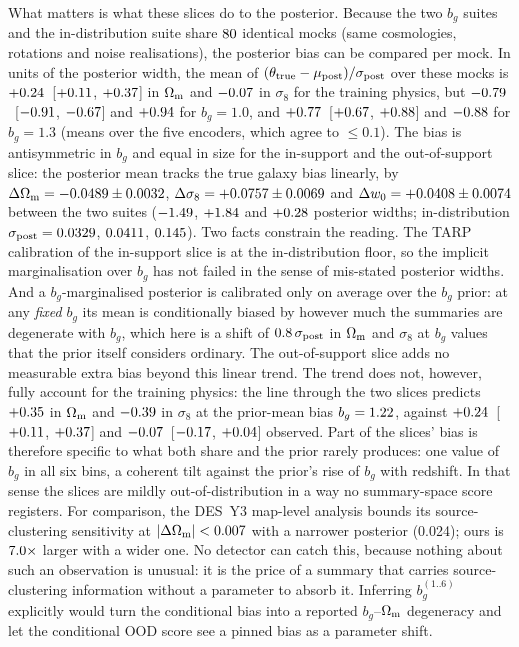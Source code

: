 \documentclass[9pt,twocolumn]{extarticle}
\newcommand{\Om}{\Omega_{\rm m}}
\newcommand{\sig}{\sigma_8}
\newcommand{\bg}{b_g}
\begin{document}
What matters is what these slices do to the posterior. Because the two $\bg$ suites and the
in-distribution suite share $80$ identical mocks (same cosmologies, rotations and noise
realisations), the posterior bias can be compared per mock. In units of the posterior width, the mean
of $(\theta_{\rm true}-\mu_{\rm post})/\sigma_{\rm post}$ over these mocks is
$+0.24$~[$+0.11$, $+0.37$] in $\Om$ and
$-0.07$ in $\sig$ for the training physics, but $-0.79$~[$-0.91$,
$-0.67$] and $+0.94$ for $\bg=1.0$, and
$+0.77$~[$+0.67$, $+0.88$] and
$-0.88$ for $\bg=1.3$ (means over the five encoders, which agree to $\le0.1$).
The bias is antisymmetric in $\bg$ and equal in size for the in-support and the out-of-support slice:
the posterior mean tracks the true galaxy bias linearly, by
$\Delta\Om=\NDthetaOmegaM\pm\NDthetaOmegaMSd$, $\Delta\sig=+\NDthetaSigmaEight\pm\NDthetaSigmaEightSd$ and
$\Delta w_0=+0.0408\pm0.0074$ between the two suites ($-1.49$,
$+1.84$ and $+0.28$ posterior widths; in-distribution
$\sigma_{\rm post}=0.0329$, $0.0411$, $0.145$). Two facts constrain the
reading. The TARP calibration of the in-support slice is at the in-distribution floor, so the implicit
marginalisation over $\bg$ has not failed in the sense of mis-stated posterior widths. And a
$\bg$-marginalised posterior is calibrated only on average over the $\bg$ prior: at any \emph{fixed}
$\bg$ its mean is conditionally biased by however much the summaries are degenerate with $\bg$, which
here is a shift of $0.8\,\sigma_{\rm post}$ in $\Om$ and $\sig$ at $\bg$ values that the prior itself
considers ordinary. The out-of-support slice adds no measurable extra bias beyond this linear trend. The trend does not,
however, fully account for the training physics: the line through the two slices predicts
$+0.35$ in $\Om$ and $-0.39$ in $\sig$ at the prior-mean bias
$\bg=\BBgPriorMeanAvg$, against $+0.24$~[$+0.11$, $+0.37$] and
$-0.07$~[$-0.17$, $+0.04$] observed. Part of the
slices' bias is therefore specific to what both share and the prior rarely produces: one value of $\bg$
in all six bins, a coherent tilt against the prior's rise of $\bg$ with redshift. In that sense the
slices are mildly out-of-distribution in a way no summary-space score registers. For
comparison, the DES~Y3 map-level analysis \cite{jeffrey2025} bounds its source-clustering sensitivity at
$|\Delta\Om|<\NDesBgBoundOmegaM$ with a narrower posterior (0.024); ours is $7.0\times$
larger with a wider one. No detector can catch this, because nothing about such an observation is
unusual: it is the price of a summary that carries source-clustering information without a parameter
to absorb it. Inferring $\bg^{(1..6)}$ explicitly would turn the conditional bias into a reported
$\bg$--$\Om$ degeneracy and let the conditional OOD score see a pinned bias as a parameter shift.
\end{document}
